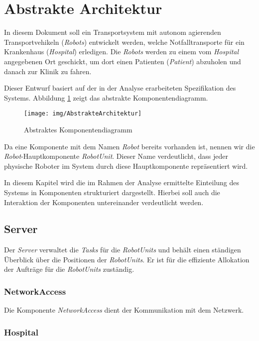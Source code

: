 \section{Abstrakte Architektur}
In diesem Dokument soll ein Transportsystem mit autonom agierenden Transportvehikeln (\emph{Robots})
entwickelt werden, welche Notfalltransporte für ein Krankenhaus (\emph{Hospital}) erledigen. Die \emph{Robots} werden zu
einem vom \emph{Hospital} angegebenen Ort geschickt, um dort einen Patienten (\emph{Patient}) abzuholen und
danach zur Klinik zu fahren.

Dieser Entwurf basiert auf der in der Analyse erarbeiteten Spezifikation des Systems. Abbildung \ref{KomponentendiagrammAbstrakt} zeigt das abstrakte Komponentendiagramm.

\begin{figure}[H]
	\centering
	\texttt{[image: img/AbstrakteArchitektur]}
	\caption{Abstraktes Komponentendiagramm}
	\label{KomponentendiagrammAbstrakt}
\end{figure}

Da eine Komponente mit dem Namen \emph{Robot} bereits vorhanden ist, nennen wir die \emph{Robot}-Hauptkomponente \emph{RobotUnit}. Dieser Name verdeutlicht, dass jeder physische Roboter im System durch diese Hauptkomponente repr\"{a}sentiert wird.


In diesem Kapitel wird die im Rahmen der Analyse ermittelte Einteilung des Systems in Komponenten strukturiert dargestellt. Hierbei soll auch die Interaktion der Komponenten untereinander verdeutlicht werden.

\subsection{Server}

Der \emph{Server} verwaltet die \emph{Tasks} f\"{u}r die \emph{RobotUnits} und beh\"{a}lt einen st\"{a}ndigen \"{U}berblick \"{u}ber die Positionen der \emph{RobotUnits}. Er ist f\"{u}r die effiziente Allokation der Auftr\"{a}ge f\"{u}r die \emph{RobotUnits} zust\"{a}ndig.

\subsubsection{NetworkAccess}

Die Komponente \emph{NetworkAccess} dient der Kommunikation mit dem Netzwerk.

\subsubsection{Hospital}

